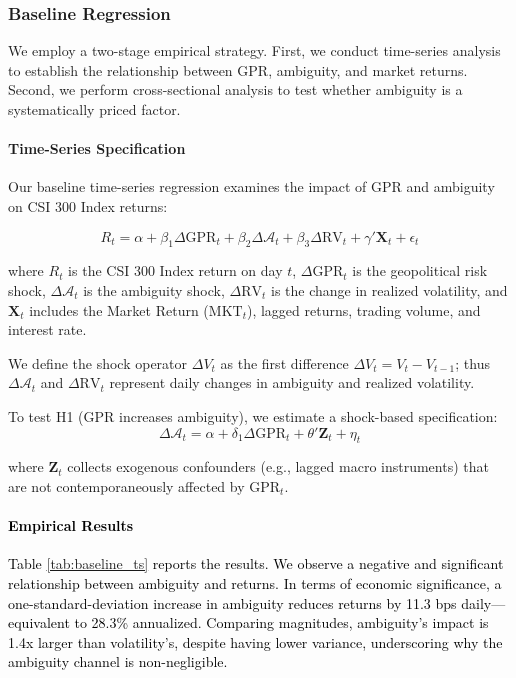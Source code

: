 \documentclass[preprint,12pt,authoryear]{elsarticle}
\begin{document}
\subsubsection{Baseline Regression}

We employ a two-stage empirical strategy. First, we conduct time-series analysis to establish the relationship between GPR, ambiguity, and market returns. Second, we perform cross-sectional analysis to test whether ambiguity is a systematically priced factor.

\paragraph{Time-Series Specification}
Our baseline time-series regression examines the impact of GPR and ambiguity on CSI 300 Index returns:

\begin{equation}
R_{t} = \alpha + \beta_1 \Delta \text{GPR}_{t} + \beta_2 \Delta \mathcal{A}_{t} + \beta_3 \Delta \text{RV}_{t} + \gamma' \mathbf{X}_{t} + \epsilon_{t}
\end{equation}

where $R_t$ is the CSI 300 Index return on day $t$, $\Delta \text{GPR}_t$ is the geopolitical risk shock, $\Delta \mathcal{A}_t$ is the ambiguity shock, $\Delta \text{RV}_t$ is the change in realized volatility, and $\mathbf{X}_t$ includes the Market Return ($\text{MKT}_t$), lagged returns, trading volume, and interest rate.

We define the shock operator $\Delta V_t$ as the first difference $\Delta V_t = V_t - V_{t-1}$; thus $\Delta \mathcal{A}_t$ and $\Delta \text{RV}_t$ represent daily changes in ambiguity and realized volatility.

To test H1 (GPR increases ambiguity), we estimate a shock-based specification:
\begin{equation}
\Delta \mathcal{A}_{t} = \alpha + \delta_1 \Delta \text{GPR}_{t} + \theta' \mathbf{Z}_{t} + \eta_{t}
\end{equation}

where $\mathbf{Z}_t$ collects exogenous confounders (e.g., lagged macro instruments) that are not contemporaneously affected by $\text{GPR}_t$.

\paragraph{\textcolor{black}{Empirical Results}}
\textcolor{black}{Table \ref{tab:baseline_ts} reports the results. We observe a negative and significant relationship between ambiguity and returns. In terms of economic significance, a one-standard-deviation increase in ambiguity reduces returns by 11.3 bps daily---equivalent to 28.3\% annualized. Comparing magnitudes, ambiguity's impact is 1.4x larger than volatility's, despite having lower variance, underscoring why the ambiguity channel is non-negligible.}
\end{document}
